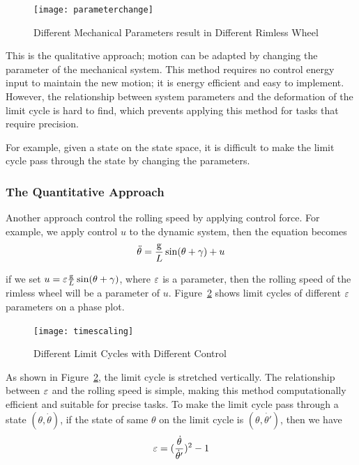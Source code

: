 \begin{figure}[!htbp]
  \begin{center}
     \texttt{[image: parameterchange]}
    \caption{Different Mechanical Parameters result in Different Rimless Wheel}
    \label{fig:morphyingrimlesss}  
  \end{center}
\end{figure}



This is the qualitative approach; motion can be adapted by changing the parameter of the mechanical system. 
This method  requires no control energy input to maintain the new motion; it is energy efficient and easy to implement. 
However, the relationship between system parameters and the deformation of the limit cycle is hard to find, which prevents applying this method for tasks that require precision. 

For example, given a state on the state space, it is difficult to make the limit cycle pass through the state by changing the parameters.

\subsubsection*{The Quantitative Approach}

Another approach control the rolling speed by applying control force.
For example, we apply control $u$ to the dynamic system, then the equation becomes
\[
\ddot{\theta}=\frac{\mathrm{g}}{L}\sin(\theta+\gamma)+u
\]

if we set $u = \varepsilon\frac{\mathrm{g}}{L}\sin(\theta+\gamma)$, where $\varepsilon$ is a parameter, then the rolling speed of the rimless wheel will be a parameter of $u$.
Figure~\ref{fig:timescalingrimlesswheel} shows limit cycles of different $\varepsilon$ parameters on a phase plot.
\begin{figure}[!htbp]
  \begin{center}
     \texttt{[image: timescaling]}
    \caption{Different Limit Cycles with Different Control}
    \label{fig:timescalingrimlesswheel}  
  \end{center}
\end{figure}

 As shown in Figure~\ref{fig:timescalingrimlesswheel}, the limit cycle is stretched vertically.
The relationship between $\varepsilon$ and the rolling speed is simple, making this method computationally efficient and suitable for precise tasks. To make the limit cycle pass through a state $(\theta, \dot{\theta})$, if the state of same $\theta$ on the limit cycle is $(\theta,\dot{\theta'})$, then we have 
\[
\varepsilon= (\frac{\dot{\theta}}{\dot{\theta}'})^2-1
\]

